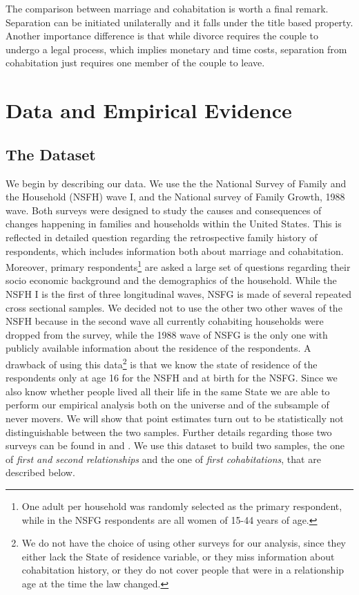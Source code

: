 \documentclass[12pt]{article}
\numberwithin{table}{section}
\begin{document}
The comparison between marriage and cohabitation is worth a final remark. Separation can be initiated unilaterally and it falls under the title based property. Another importance difference is that while divorce requires the couple to undergo a legal process, which implies monetary and time costs, separation from cohabitation just requires one member of the couple to leave. 
\section{Data and Empirical Evidence}
\subsection{The Dataset}\label{dataset}
We begin by describing our data. We use the the National Survey of Family and the Household (NSFH) wave I, and the National survey of Family Growth, 1988 wave. Both surveys were designed to study the causes and consequences of changes happening in families and households within the United States. This is reflected in detailed question regarding the retrospective family history of respondents, which includes information both about marriage and cohabitation. Moreover, primary respondents\footnote{One adult per household was randomly selected as the primary respondent, while in the NSFG respondents are all women of 15-44 years of age.} are asked a large set of questions regarding their socio economic background and the demographics of the household. While the NSFH I is the first of three longitudinal waves, NSFG is made of several repeated cross sectional samples. We decided not to use the other two other waves of the NSFH because in the second wave all currently cohabiting households were dropped from the survey, while the 1988 wave of NSFG is the only one with publicly available information about the residence of the respondents. A drawback of using this data\footnote{We do not have the choice of using other surveys for our analysis, since they either lack the State of residence variable, or they miss information about cohabitation history, or they do not cover people that were in a relationship age at the time the law changed.} is that we know the state of residence of the respondents only at age 16 for the NSFH and at birth for the NSFG. Since we also know whether people lived all their life in the same State we are able to perform our empirical analysis both on the universe and of the subsample of never movers. We will show that point estimates turn out to be statistically not distinguishable between the two samples. Further details regarding those two surveys can be found in \cite{bumpass2017} and \cite{mosher1996}. We use this dataset to build two samples, the one of \textit{first and second relationships} and the one of \textit{first cohabitations}, that are described below.  
\end{document}
